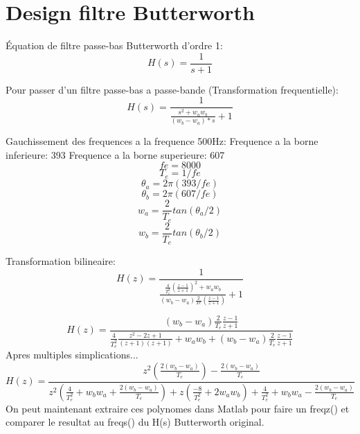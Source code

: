 \documentclass{article}
\begin{document}
\section{Design filtre Butterworth}
Équation de filtre passe-bas Butterworth d'ordre 1:
\begin{equation}
	H(s) = \frac{1}{s+1}
\end{equation}

Pour passer d'un filtre passe-bas a passe-bande (Transformation frequentielle):
\begin{equation}
	H(s) = \frac{1}{\frac{s^2+w_aw_b}{(w_b-w_a)*s}+1}
\end{equation}

Gauchissement des frequences a la frequence 500Hz:
\newline
Frequence a la borne inferieure: 393
\newline
Frequence a la borne superieure: 607
\begin{equation}
	fe = 8000
\end{equation}
\begin{equation}
	T_e = 1/fe
\end{equation}
\begin{equation}
	\theta_a = 2\pi(393/fe)
\end{equation}
\begin{equation}
	\theta_b = 2\pi(607/fe)
\end{equation}
\begin{equation}
	w_a = \frac{2}{T_e}tan(\theta_a/2)
\end{equation}
\begin{equation}
	w_b = \frac{2}{T_e}tan(\theta_b/2)
\end{equation}

Transformation bilineaire:
\begin{equation}
	H(z) = \frac{1}{\frac{\frac{4}{T_e^2}(\frac{z-1}{z+1})^2+w_aw_b}{(w_b-w_a)\frac{2}{Te}(\frac{z-1}{z+1})}+1}
\end{equation}

\begin{equation}
	H(z) = \frac{(w_b-w_a)\frac{2}{T_e}\frac{z-1}{z+1}}{\frac{4}{T_e^2}\frac{z^2-2z+1}{(z+1)(z+1)}+w_aw_b+(w_b-w_a)\frac{2}{T_e}\frac{z-1}{z+1}}
\end{equation}
Apres multiples simplications...
\begin{equation}
	H(z) = \frac{z^2(\frac{2(w_b-w_a)}{T_e})-\frac{2(w_b-w_a)}{T_e}}{z^2(\frac{4}{T_e^2}+w_bw_a+\frac{2(w_b-w_a)}{T_e})+z(\frac{-8}{T_e^2}+2w_aw_b)+\frac{4}{T_e^2}+w_bw_a-\frac{2(w_b-w_a)}{T_e}}
\end{equation}
On peut maintenant extraire ces polynomes dans Matlab pour faire un freqz() et comparer le resultat au freqs() du H(s) Butterworth original.
\end{document}
